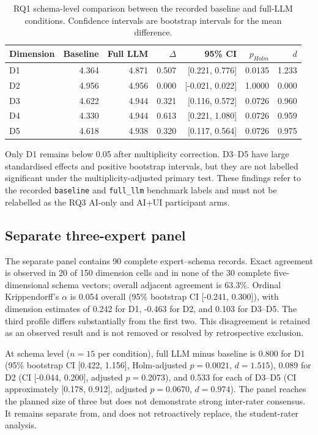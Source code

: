 \documentclass[11pt,a4paper]{article}
\begin{document}
\begin{table}[htbp]
\centering
\begin{tabular}{lrrrrrr}
\toprule
\textbf{Dimension} & \textbf{Baseline} & \textbf{Full LLM} & \textbf{$\Delta$} & \textbf{95\% CI} & \textbf{$p_{Holm}$} & \textbf{$d$}\\
\midrule
D1 & 4.364 & 4.871 & 0.507 & [0.221, 0.776]  & 0.0135 & 1.233\\
D2 & 4.956 & 4.956 & 0.000 & [-0.021, 0.022] & 1.0000 & 0.000\\
D3 & 4.622 & 4.944 & 0.321 & [0.116, 0.572]  & 0.0726 & 0.960\\
D4 & 4.330 & 4.944 & 0.613 & [0.221, 1.080]  & 0.0726 & 0.959\\
D5 & 4.618 & 4.938 & 0.320 & [0.117, 0.564]  & 0.0726 & 0.975\\
\bottomrule
\end{tabular}
\caption{RQ1 schema-level comparison between the recorded baseline and full-LLM conditions. Confidence intervals are bootstrap intervals for the mean difference.}
\label{tab:rq1-condition}
\end{table}

Only D1 remains below 0.05 after multiplicity correction. D3--D5 have large
standardised effects and positive bootstrap intervals, but they are not labelled
significant under the multiplicity-adjusted primary test. These findings refer
to the recorded \texttt{baseline} and \texttt{full\_llm} benchmark labels and
must not be relabelled as the RQ3 AI-only and AI+UI participant arms.

\subsection{Separate three-expert panel}

The separate panel contains 90 complete expert--schema records. Exact agreement
is observed in 20 of 150 dimension cells and in none of the 30 complete
five-dimensional schema vectors; overall adjacent agreement is 63.3\%.
Ordinal Krippendorff's $\alpha$ is 0.054 overall (95\% bootstrap CI
[-0.241, 0.300]), with dimension estimates of 0.242 for D1, -0.463 for D2,
and 0.103 for D3--D5. The third profile differs substantially from the first
two. This disagreement is retained as an observed result and is not removed or
resolved by retrospective exclusion.

At schema level ($n=15$ per condition), full LLM minus baseline is 0.800 for D1
(95\% bootstrap CI [0.422, 1.156], Holm-adjusted $p=0.0021$, $d=1.515$),
0.089 for D2 (CI [-0.044, 0.200], adjusted $p=0.2073$), and 0.533 for each
of D3--D5 (CI approximately [0.178, 0.912], adjusted $p=0.0670$,
$d=0.974$). The panel reaches the planned size of three but does not demonstrate
strong inter-rater consensus. It remains separate from, and does not
retroactively replace, the student-rater analysis.
\end{document}
